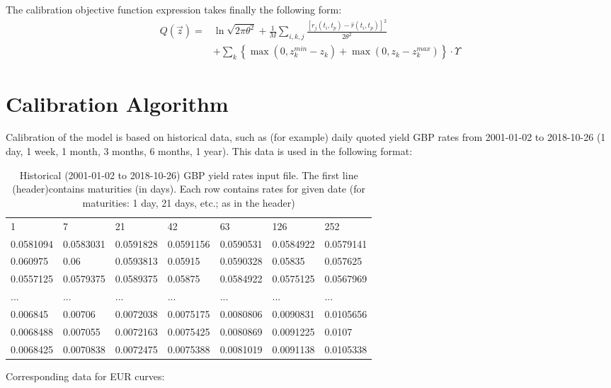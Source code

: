 \documentclass[10pt]{article}
\begin{document}
The calibration objective function expression takes finally the following form:
\begin{align}
\label{Q}
\nonumber   Q(\vec z)= &\ln {\sqrt{2 \pi \theta^2} } + \frac{1}{M}\sum_{i,k,j}\frac{\left[r_j(t_i,t_p)-\hat r(t_i,t_p)\right]^2}{2\theta^2} \\
& +\sum_k \left\{ \max (0, z_k^{min} - z_k)
 + \max (0,z_k - z_k^{max}) \right\}\cdot \Upsilon
\end{align}
 
\section{Calibration Algorithm}\label{num_alg}

Calibration of the model is based on historical data, such as (for example) daily quoted yield GBP rates from  2001-01-02 to 2018-10-26 (1 day, 1 week, 1 month, 3 months, 6 months, 1 year). This data is used in the following format:
\begin{table}[H]  
\begin{tabular}{ lllllll}
\hline
1 & 7  & 21    & 42    & 63  & 126    & 252   \\
0.0581094 & 0.0583031 & 0.0591828 & 0.0591156 & 0.0590531 & 0.0584922 & 0.0579141 \\
0.060975 & 0.06 & 0.0593813 & 0.05915 & 0.0590328 & 0.05835 & 0.057625  \\
0.0557125 & 0.0579375 & 0.0589375 & 0.05875 & 0.0584922 & 0.0575125 & 0.0567969  \\
...&...&...&...&...&...&... \\
0.006845 & 0.00706 & 0.0072038 & 0.0075175 & 0.0080806 & 0.0090831 & 0.0105656  \\
0.0068488 & 0.007055 & 0.0072163 & 0.0075425 & 0.0080869 & 0.0091225 & 0.0107  \\
0.0068425 & 0.0070838 & 0.0072475 & 0.0075388 & 0.0081019 & 0.0091138 & 0.0105338  \\
\hline
\end{tabular}
\caption{Historical (2001-01-02 to 2018-10-26) GBP yield rates input file. The first line (header)contains maturities (in days). Each row contains rates for given date (for maturities: 1 day, 21 days, etc.; as in the header)  } \label{gbp_in}
\end{table}
Corresponding data for EUR curves:
\end{document}
